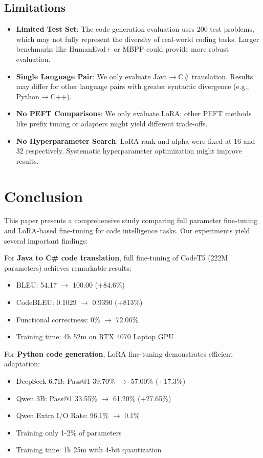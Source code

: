 \documentclass[conference]{IEEEtran}
\begin{document}
\subsection{Limitations}

\begin{itemize}
    \item \textbf{Limited Test Set}: The code generation evaluation uses 200 test problems, which may not fully represent the diversity of real-world coding tasks. Larger benchmarks like HumanEval+ or MBPP could provide more robust evaluation.
    
    \item \textbf{Single Language Pair}: We only evaluate Java$\rightarrow$C\# translation. Results may differ for other language pairs with greater syntactic divergence (e.g., Python$\rightarrow$C++).
    
    \item \textbf{No PEFT Comparisons}: We only evaluate LoRA; other PEFT methods like prefix tuning or adapters might yield different trade-offs.
    
    \item \textbf{No Hyperparameter Search}: LoRA rank and alpha were fixed at 16 and 32 respectively. Systematic hyperparameter optimization might improve results.
\end{itemize}

\section{Conclusion}

This paper presents a comprehensive study comparing full parameter fine-tuning and LoRA-based fine-tuning for code intelligence tasks. Our experiments yield several important findings:

For \textbf{Java to C\# code translation}, full fine-tuning of CodeT5 (222M parameters) achieves remarkable results:
\begin{itemize}
    \item BLEU: 54.17 $\rightarrow$ 100.00 (+84.6\%)
    \item CodeBLEU: 0.1029 $\rightarrow$ 0.9390 (+813\%)
    \item Functional correctness: 0\% $\rightarrow$ 72.06\%
    \item Training time: 4h 52m on RTX 4070 Laptop GPU
\end{itemize}

For \textbf{Python code generation}, LoRA fine-tuning demonstrates efficient adaptation:
\begin{itemize}
    \item DeepSeek 6.7B: Pass@1 39.70\% $\rightarrow$ 57.00\% (+17.3\%)
    \item Qwen 3B: Pass@1 33.55\% $\rightarrow$ 61.20\% (+27.65\%)
    \item Qwen Extra I/O Rate: 96.1\% $\rightarrow$ 0.1\%
    \item Training only 1-2\% of parameters
    \item Training time: 1h 25m with 4-bit quantization
\end{itemize}
\end{document}
